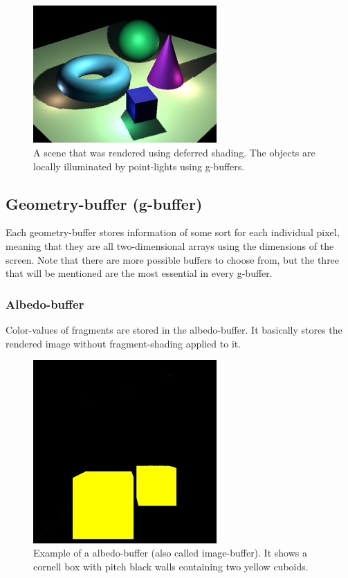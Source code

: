 \documentclass{ACGSeminar}
\begin{document}
		\begin{figure}[htb!]%
		\begin{center}%
			\includegraphics[width=7cm]{img/wiki_deferred_shading.png}
		\end{center}%
		\caption{A scene that was rendered using deferred shading. The objects are locally illuminated by point-lights using g-buffers.}%
		\label{fig:deferred_shading}%
	\end{figure}%

	\subsection{Geometry-buffer (g-buffer)}
		Each geometry-buffer stores information of some sort for each individual pixel, meaning that they are all two-dimensional arrays using the dimensions of the screen. Note that there are more possible buffers to choose from, but the three that will be mentioned are the most essential in every g-buffer.
		\subsubsection{Albedo-buffer}%
			Color-values of fragments are stored in the albedo-buffer. It basically stores the rendered image without fragment-shading applied to it.%
			\begin{figure}[htb!]%
				\begin{center}%
					\includegraphics[width=7cm]{img/frame_buffer.png}
				\end{center}%
				\caption{Example of a albedo-buffer (also called image-buffer). It shows a cornell box with pitch black walls containing two yellow cuboids.}%
				\label{fig:frame_buffer}
			\end{figure}%
\end{document}
